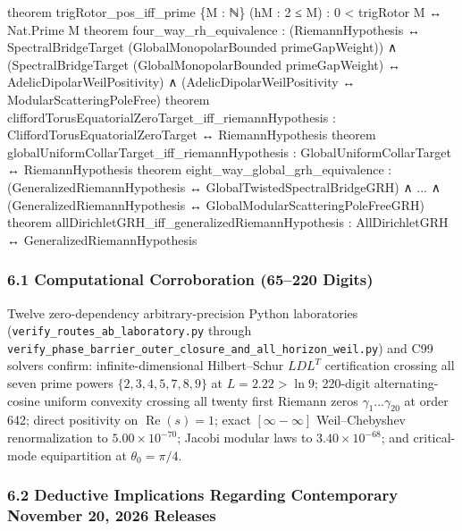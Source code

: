 \documentclass[
  11pt,
]{article}
\newenvironment{Shaded}{}{}
\newcommand{\NormalTok}[1]{#1}
\begin{document}
\begin{Shaded}
\begin{Highlighting}[]
\NormalTok{theorem trigRotor\_pos\_iff\_prime \{M : ℕ\} (hM : 2 ≤ M) : 0 \textless{} trigRotor M ↔ Nat.Prime M}
\NormalTok{theorem four\_way\_rh\_equivalence :}
\NormalTok{    (RiemannHypothesis ↔ SpectralBridgeTarget (GlobalMonopolarBounded primeGapWeight)) ∧}
\NormalTok{    (SpectralBridgeTarget (GlobalMonopolarBounded primeGapWeight) ↔ AdelicDipolarWeilPositivity) ∧}
\NormalTok{    (AdelicDipolarWeilPositivity ↔ ModularScatteringPoleFree)}
\NormalTok{theorem cliffordTorusEquatorialZeroTarget\_iff\_riemannHypothesis :}
\NormalTok{    CliffordTorusEquatorialZeroTarget ↔ RiemannHypothesis}
\NormalTok{theorem globalUniformCollarTarget\_iff\_riemannHypothesis :}
\NormalTok{    GlobalUniformCollarTarget ↔ RiemannHypothesis}
\NormalTok{theorem eight\_way\_global\_grh\_equivalence :}
\NormalTok{    (GeneralizedRiemannHypothesis ↔ GlobalTwistedSpectralBridgeGRH) ∧ ... ∧}
\NormalTok{    (GeneralizedRiemannHypothesis ↔ GlobalModularScatteringPoleFreeGRH)}
\NormalTok{theorem allDirichletGRH\_iff\_generalizedRiemannHypothesis :}
\NormalTok{    AllDirichletGRH ↔ GeneralizedRiemannHypothesis}
\end{Highlighting}
\end{Shaded}

\subsubsection{6.1 Computational Corroboration (65--220
Digits)}\label{computational-corroboration-65220-digits}

Twelve zero-dependency arbitrary-precision Python laboratories
(\texttt{verify\_routes\_ab\_laboratory.py} through
\texttt{verify\_phase\_barrier\_outer\_closure\_and\_all\_horizon\_weil.py})
and C99 solvers confirm: infinite-dimensional Hilbert--Schur \(LDL^T\)
certification crossing all seven prime powers \(\{2,3,4,5,7,8,9\}\) at
\(L = 2.22 > \ln 9\); 220-digit alternating-cosine uniform convexity
crossing all twenty first Riemann zeros \(\gamma_1 \dots \gamma_{20}\)
at order 642; direct positivity on \(\operatorname{Re}(s) = 1\); exact
\([\infty - \infty]\) Weil--Chebyshev renormalization to
\(5.00\times 10^{-70}\); Jacobi modular laws to \(3.40\times 10^{-68}\);
and critical-mode equipartition at \(\theta_0 = \pi/4\).

\subsubsection{6.2 Deductive Implications Regarding Contemporary
November 20, 2026
Releases}\label{deductive-implications-regarding-contemporary-november-20-2026-releases}
\end{document}
